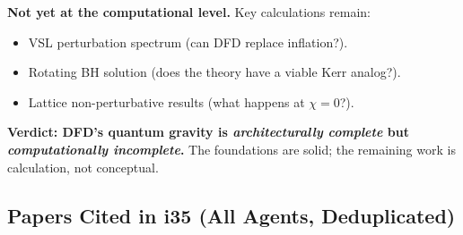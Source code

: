 \documentclass[11pt,a4paper]{article}
\begin{document}
\textbf{Not yet at the computational level.} Key calculations remain:
\begin{itemize}
\item VSL perturbation spectrum (can DFD replace inflation?).
\item Rotating BH solution (does the theory have a viable Kerr analog?).
\item Lattice non-perturbative results (what happens at $\chi = 0$?).
\end{itemize}

\textbf{Verdict: DFD's quantum gravity is \emph{architecturally complete} but \emph{computationally incomplete}.} The foundations are solid; the remaining work is calculation, not conceptual.

\subsection{Papers Cited in i35 (All Agents, Deduplicated)}
\end{document}
